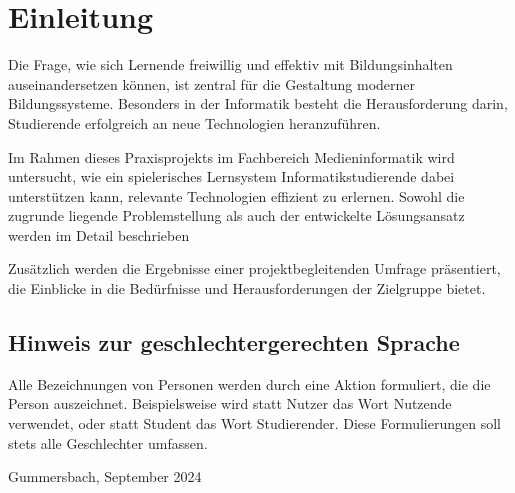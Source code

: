 \chapter{Einleitung}
%
Die Frage, wie sich Lernende freiwillig und effektiv mit Bildungsinhalten auseinandersetzen können, ist zentral für die Gestaltung moderner Bildungssysteme. 
Besonders in der Informatik besteht die Herausforderung darin, Studierende erfolgreich an neue Technologien heranzuführen.
\par
Im Rahmen dieses Praxisprojekts im Fachbereich Medieninformatik wird untersucht, wie ein spielerisches Lernsystem Informatikstudierende dabei unterstützen kann, relevante Technologien effizient zu erlernen.
Sowohl die zugrunde liegende Problemstellung als auch der entwickelte Lösungsansatz werden im Detail beschrieben
\par
Zusätzlich werden die Ergebnisse einer projektbegleitenden Umfrage präsentiert, die Einblicke in die Bedürfnisse und Herausforderungen der Zielgruppe bietet.\enlargethispage{\baselineskip}
%

\section*{Hinweis zur geschlechtergerechten Sprache}
Alle Bezeichnungen von Personen werden durch eine Aktion formuliert, die die Person auszeichnet. 
Beispielsweise wird statt Nutzer das Wort Nutzende verwendet, oder statt Student das Wort Studierender. 
Diese Formulierungen soll stets alle Geschlechter umfassen.

\begin{flushright}
Gummersbach, September 2024
\end{flushright}
